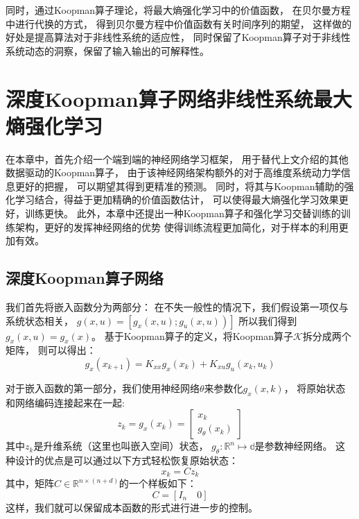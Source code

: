 \documentclass[AutoFakeBold]{LZUThesis}
\begin{document}
同时，通过Koopman算子理论，将最大熵强化学习中的价值函数，
在贝尔曼方程中进行代换的方式，
得到贝尔曼方程中价值函数有关时间序列的期望，
这样做的好处是提高算法对于非线性系统的适应性，
同时保留了Koopman算子对于非线性系统动态的洞察，保留了输入输出的可解释性。


\chapter{深度Koopman算子网络非线性系统最大熵强化学习}
在本章中，首先介绍一个端到端的神经网络学习框架，
用于替代上文介绍的其他数据驱动的Koopman算子，
由于该神经网络架构额外的对于高维度系统动力学信息更好的把握，
可以期望其得到更精准的预测。
同时，将其与Koopman辅助的强化学习结合，得益于更加精确的价值函数估计，
可以使得最大熵强化学习效果更好，训练更快。
此外，本章中还提出一种Koopman算子和强化学习交替训练的训练架构，更好的发挥神经网络的优势
使得训练流程更加简化，对于样本的利用更加有效。

\section{深度Koopman算子网络}
我们首先将嵌入函数分为两部分：
在不失一般性的情况下，我们假设第一项仅与系统状态相关，
$\left.g(x, u)=\left[g_{x}(x, u) ; g_{u}(x, u)\right)\right]$
所以我们得到$g_x(x, u) = g_x(x)$。
基于Koopman算子的定义，将Koopman算子$\mathcal{K}$拆分成两个矩阵，
则可以得出：
\begin{equation}
  g_{x}\left(x_{k+1}\right)=K_{x x} g_{x}\left(x_{k}\right)+
  K_{x u} g_{u}\left(x_{k}, u_{k}\right)
\end{equation}

对于嵌入函数的第一部分，我们使用神经网络$\theta$来参数化$g_x(x, k)$，
将原始状态和网络编码连接起来在一起:
\begin{equation}
  z_{k}=g_{x}\left(x_{k}\right)=
  \left[\begin{array}{c}
  x_{k} \\
  g_{\theta}\left(x_{k}\right)
  \end{array}\right]
\end{equation}
其中$z_k$是升维系统（这里也叫嵌入空间）状态，
$g_\theta : \mathbb{R}^n \mapsto \mathbb{d}$是参数神经网络。
这种设计的优点是可以通过以下方式轻松恢复原始状态：
\begin{equation}
  x_k = C z_k
\end{equation}
其中，矩阵$C \in \mathbb{R}^{n \times (n + d)}$的一个样板如下：
\begin{equation}
  C = \left[ I_n \quad 0 \right]
\end{equation}
这样，我们就可以保留成本函数的形式进行进一步的控制。
\end{document}
